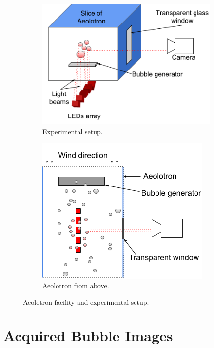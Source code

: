 \begin{figure}[h]
			\begin{subfigure}[t]{.4\linewidth}		
				\includegraphics[scale=.5]{images/aeolotron_setup.png}
				\caption{Experimental setup.}
			\end{subfigure}\hfill%
			\begin{subfigure}[t]{.4\linewidth}		
				\includegraphics[scale=.5]{images/aeolotron_setup_above.png}
				\caption{Aeolotron from above.}
				\label{subfig:aeolotron_setup_above}
			\end{subfigure}
			
			\caption{Aeolotron facility and experimental setup.}
			\label{fig:aeolotron_setup}
		\end{figure}
	
		
		
	\section{Acquired Bubble Images}\label{measurement_results}
	
